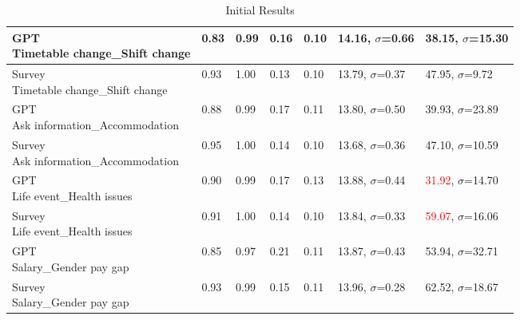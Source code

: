 \begin{table}[]
{\begin{tabular}{|l|l|l|l|l|l|l|}
    \shortstack[l]{GPT\\Timetable change\_Shift change}                               & 0.83                          & 0.99                         & 0.16                              & 0.10                              & 14.16, $\sigma$=0.66              & 38.15, $\sigma$=15.30    \\ \hline
    \shortstack[l]{Survey\\Timetable change\_Shift change}                            & 0.93                          & 1.00                         & 0.13                              & 0.10                              & 13.79, $\sigma$=0.37              & 47.95, $\sigma$=9.72     \\ \hline
    \shortstack[l]{GPT\\Ask information\_Accommodation}                               & 0.88                          & 0.99                         & 0.17                              & 0.11                              & 13.80, $\sigma$=0.50              & 39.93, $\sigma$=23.89    \\ \hline
    \shortstack[l]{Survey\\Ask information\_Accommodation}                            & 0.95                          & 1.00                         & 0.14                              & 0.10                              & 13.68, $\sigma$=0.36              & 47.10, $\sigma$=10.59    \\ \hline
    \shortstack[l]{GPT\\Life event\_Health issues}                                    & 0.90                          & 0.99                         & 0.17                              & 0.13                              & 13.88, $\sigma$=0.44              & \textcolor{red}{31.92}, $\sigma$=14.70    \\ \hline
    \shortstack[l]{Survey\\Life event\_Health issues}                                 & 0.91                          & 1.00                         & 0.14                              & 0.10                              & 13.84, $\sigma$=0.33              & \textcolor{red}{59.07}, $\sigma$=16.06    \\ \hline
    \shortstack[l]{GPT\\Salary\_Gender pay gap}                                       & 0.85                          & 0.97                         & 0.21                              & 0.11                              & 13.87, $\sigma$=0.43              & 53.94, $\sigma$=32.71    \\ \hline
    \shortstack[l]{Survey\\Salary\_Gender pay gap}                                    & 0.93                          & 0.99                         & 0.15                              & 0.11                              & 13.96, $\sigma$=0.28              & 62.52, $\sigma$=18.67    \\ \hline
    \end{tabular}}
    \caption{Initial Results}\label{table:initial_results}
\end{table}



